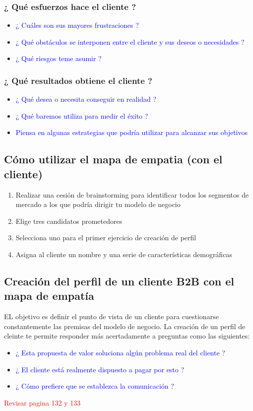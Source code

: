 \documentclass[11pt]{book}
\begin{document}
\subsubsection{¿ Qué esfuerzos hace el cliente ?}
\begin{itemize}
\item\textcolor{blue}{¿ Cuáles son sus mayores frustraciones ?}
\item\textcolor{blue}{¿ Qué obstáculos se interponen entre el cliente y sus deseos o necesidades ?}
\item\textcolor{blue}{¿ Qué riesgos teme asumir ?}
\end{itemize}
\subsubsection{¿ Qué resultados obtiene el cliente ?}
\begin{itemize}
\item\textcolor{blue}{¿ Qué desea o necesita conseguir en realidad ?}
\item\textcolor{blue}{¿ Qué baremos utiliza para medir el éxito ?}
\item\textcolor{blue}{ Piensa en algunas estrategias que podría utilizar para alcanzar sus objetivos }
\end{itemize}
\subsection{Cómo utilizar el mapa de empatia (con el cliente)}
\begin{enumerate}[1.]
\item Realizar una cesión de brainstorming para identificar todos los segmentos de mercado a los que podría dirigir tu modelo de negocio
\item Elige tres candidatos prometedores
\item Selecciona uno para el primer ejercicio de creación de perfil
\item Asigna al cliente un nombre y una serie de características demográficas 
\end{enumerate}
\subsection{Creación del perfil de un cliente B2B con el mapa de empatía}
EL objetivo es definir el punto de vista de un cliente para cuestionarse constantemente las premisas del modelo de negocio. La creación de un perfil de cleinte te permite responder más acertadamente a preguntas como las siguientes:
\begin{itemize}
\item\textcolor{blue}{ ¿ Esta propuesta de valor soluciona algún problema real del cliente ? }
\item\textcolor{blue}{ ¿ El cliente está realmente dispuesto a pagar por esto ? }
\item\textcolor{blue}{ ¿ Cómo prefiere que se establezca la comunicación ? }
\end{itemize}
\begin{flushright}
\textcolor{red}{Revisar pagina 132 y 133}
\end{flushright}
\end{document}
